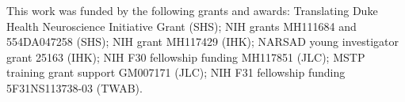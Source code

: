 
This work was funded by the following grants and awards:
Translating Duke Health Neuroscience Initiative Grant (SHS);
NIH grants MH111684 and 554DA047258 (SHS);
NIH grant MH117429 (IHK);
NARSAD young investigator grant 25163 (IHK);
NIH F30 fellowship funding MH117851 (JLC);
MSTP training grant support GM007171 (JLC);
NIH F31 fellowship funding 5F31NS113738-03 (TWAB).
